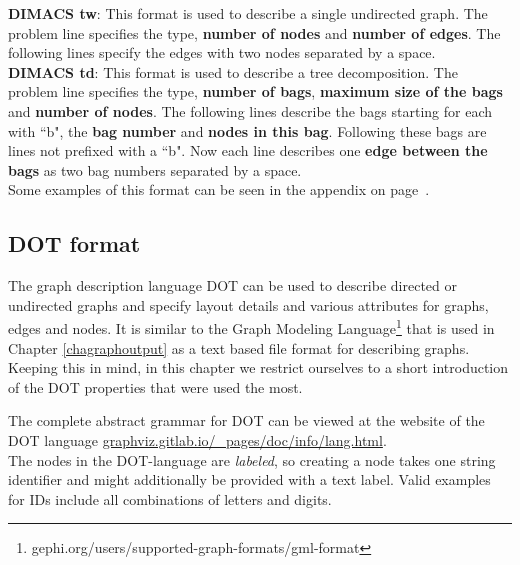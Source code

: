 \documentclass[a4paper, 12pt, bibliography=totoc]{scrartcl}
\begin{document}
\textbf{DIMACS tw}: This format is used to describe a single undirected graph. The problem line specifies the type, \textbf{number of nodes} and \textbf{number of edges}. The following lines specify the edges with two nodes separated by a space.\\

\textbf{DIMACS td}: This format is used to describe a tree decomposition. The problem line specifies the type, \textbf{number of bags}, \textbf{maximum size of the bags} and \textbf{number of nodes}. The following lines describe the bags starting for each with ``b", the \textbf{bag number} and \textbf{nodes in this bag}. Following these bags are lines not prefixed with a ``b". Now each line describes one \textbf{edge between the bags} as two bag numbers separated by a space.\\


Some examples of this format can be seen in the appendix on page~\pageref{app:input}.

\subsection{DOT format}
The graph description language DOT can be used to describe directed or undirected graphs and specify layout details and various attributes for graphs, edges and nodes. It is similar to the Graph Modeling Language\footnote{gephi.org/users/supported-graph-formats/gml-format} that is used in Chapter \ref{chagraphoutput} as a text based file format for describing graphs. Keeping this in mind, in this chapter we restrict ourselves to a short introduction of the DOT properties that were used the most.



The complete abstract grammar for DOT can be viewed at the website of the DOT language \url{graphviz.gitlab.io/_pages/doc/info/lang.html}.\\


The nodes in the DOT-language are \emph{labeled}, so creating a node takes one string identifier and might additionally be provided with a text label. Valid examples for IDs include all combinations of letters and digits.
\end{document}
